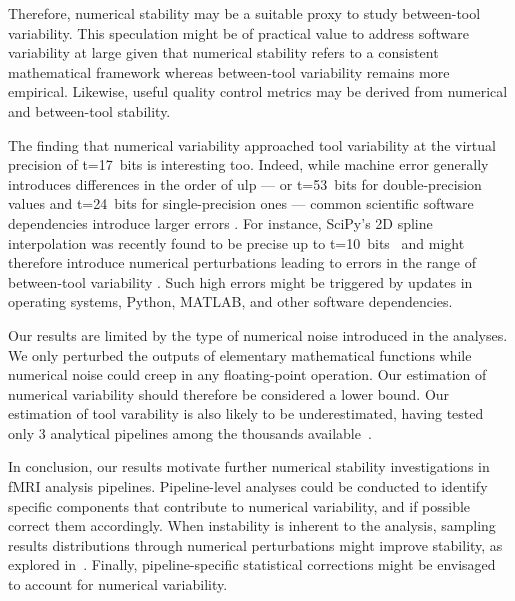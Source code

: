 \documentclass[11pt,onecolumn]{article}
\begin{document}
{Therefore, numerical stability may be a suitable proxy to study
between-tool variability. This speculation might be of practical value to
address software variability at large given that numerical stability refers
to a consistent mathematical framework whereas between-tool variability
remains more empirical. Likewise, useful quality control metrics may be derived from numerical and between-tool stability.

The finding that numerical variability approached tool variability at the
virtual precision of t=17~bits is interesting too. Indeed, while machine
error generally introduces differences in the order of   ulp
--- or
t=53~bits for double-precision values and t=24~bits for single-precision
ones --- common scientific software dependencies introduce larger errors
.
For instance, SciPy's 2D spline interpolation was recently found to be
precise up to t=10~bits~\cite{pytracer} 
 and might therefore introduce
numerical perturbations leading to errors in the range of between-tool
variability . Such high errors
might be triggered by updates in operating systems, Python, MATLAB, and
other software dependencies.

Our results are limited by the type of numerical noise introduced in the
analyses. We only perturbed the outputs of elementary
mathematical functions while numerical noise could creep in any
floating-point operation. Our estimation of numerical variability should
therefore be considered a lower bound. Our estimation of tool varability is
also likely to be underestimated, having tested only 3 analytical pipelines
among the thousands available~\cite{carp2012plurality}.

In conclusion, our results motivate further numerical stability
investigations in fMRI analysis pipelines. Pipeline-level analyses could be
conducted to identify specific components that contribute to numerical
variability, and if possible correct them accordingly. When instability is
inherent to the analysis, sampling results distributions through numerical
perturbations might improve stability, as explored in~\cite{kiar2021data}.
Finally, pipeline-specific statistical corrections might be envisaged to
account for numerical variability.

}
\end{document}
